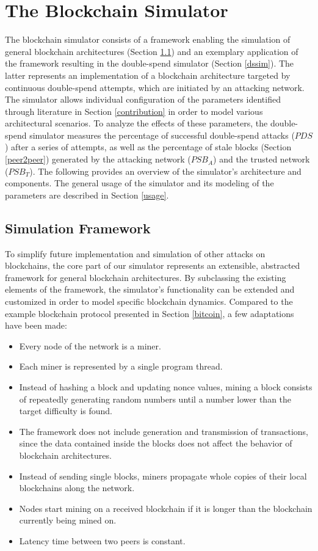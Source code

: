 \documentclass[a4paper,12pt,twoside]{report}
\begin{document}
\chapter{The Blockchain Simulator} \label{simulator}
The blockchain simulator consists of a framework enabling the simulation of general blockchain architectures (Section \ref{simframework}) and an exemplary application of the framework resulting in the double-spend simulator (Section \ref{dssim}). The latter represents an implementation of a blockchain architecture targeted by continuous double-spend attempts, which are initiated by an attacking network. The simulator allows individual configuration of the parameters identified through literature in Section \ref{contribution} in order to model various architectural scenarios. To analyze the effects of these parameters, the double-spend simulator measures the percentage of successful double-spend attacks ($PDS$) after a series of attempts, as well as the percentage of stale blocks (Section \ref{peer2peer}) generated by the attacking network ($PSB_A$) and the trusted network ($PSB_T$). The following provides an overview of the simulator's architecture and components. The general usage of the simulator and its modeling of the parameters are described in Section \ref{usage}.
\section{Simulation Framework} \label{simframework}
To simplify future implementation and simulation of other attacks on block\-chains, the core part of our simulator represents an extensible, abstracted framework for general blockchain architectures. By subclassing the existing elements of the framework, the simulator's functionality can be extended and customized in order to model specific blockchain dynamics. Compared to the example blockchain protocol presented in Section \ref{bitcoin}, a few adaptations have been made:
\begin{itemize}
\item Every node of the network is a miner.
\item Each miner is represented by a single program thread.
\item Instead of hashing a block and updating nonce values, mining a block consists of repeatedly generating random numbers until a number lower than the target difficulty is found.
\item The framework does not include generation and transmission of transactions, since the data contained inside the blocks does not affect the behavior of blockchain architectures.
\item Instead of sending single blocks, miners propagate whole copies of their local blockchains along the network.
\item Nodes start mining on a received blockchain if it is longer than the blockchain currently being mined on.
\item Latency time between two peers is constant.
\end{itemize}
\end{document}
